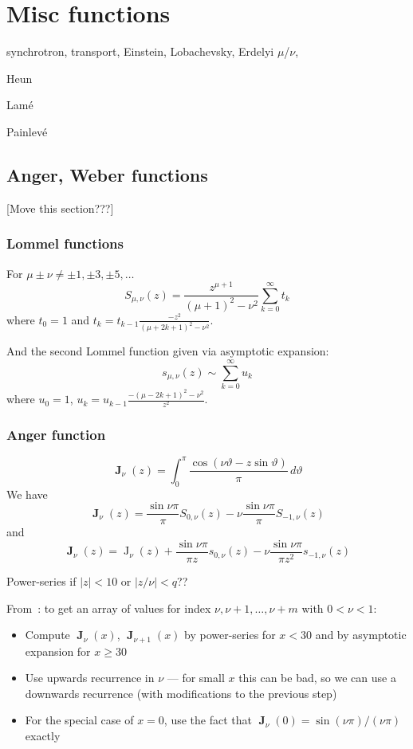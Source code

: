 \documentclass[10pt,dvipdfmx,letterpaper,twoside]{article}
\let\O=\operatorname
\newcommand{\Ob}[1]{\operatorname{\mathbf{#1}}}
\newenvironment{implementation}{\noindent\begin{framed}}{\end{framed}}
\let\theta=\vartheta
\begin{document}
\section{Misc functions}

synchrotron, transport, Einstein, Lobachevsky, Erdelyi $\mu$/$\nu$,

Heun

Lam\'e

Painlev\'e

\subsection{Anger, Weber functions}
[Move this section???]

\subsubsection{Lommel functions}
For $\mu\pm\nu\neq\pm1,\pm3,\pm5,\dots$
\[ S_{\mu,\nu}(z) = \frac{z^{\mu+1}}{(\mu+1)^2 - \nu^2} \sum_{k=0}^\infty t_k \]
where $t_0 = 1$ and $t_k = t_{k-1}\frac{-z^2}{(\mu+2k+1)^2 - \nu^2}$.

And the second Lommel function given via asymptotic expansion:
\[ s_{\mu,\nu}(z) \sim \sum_{k=0}^\infty u_k \]
where $u_0=1$, $u_k = u_{k-1}\frac{-(\mu-2k+1)^2 - \nu^2}{z^2}$.

\subsubsection{Anger function}
\[ \Ob{J}_\nu(z) = \int_0^\pi\frac{\cos(\nu\theta - z\sin\theta)}{\pi}\,d\theta \]
We have
\[ \Ob{J}_\nu(z) = \frac{\sin\nu\pi}{\pi}S_{0,\nu}(z) - \nu\frac{\sin\nu\pi}{\pi}S_{-1,\nu}(z) \]
and
\[ \Ob{J}_\nu(z) = \O{J}_\nu(z) + \frac{\sin\nu\pi}{\pi z}s_{0,\nu}(z) - \nu\frac{\sin\nu\pi}{\pi z^2}s_{-1,\nu}(z) \]

Power-series if $|z|<10$ or $|z/\nu|<q$??
\begin{implementation}
From~\cite{atlas:thompson}: to get an array of values for index $\nu, \nu+1, \dots, \nu+m$ with $0<\nu<1$:
\begin{itemize}
\item Compute $\Ob{J}_\nu(x)$, $\Ob{J}_{\nu+1}(x)$ by power-series for $x<30$ and by asymptotic expansion for $x\geq30$
\item Use upwards recurrence in $\nu$ --- for small $x$ this can be bad, so we can use a downwards recurrence
    (with modifications to the previous step)
\item For the special case of $x=0$, use the fact that $\Ob{J}_\nu(0) = \sin(\nu\pi)/(\nu\pi)$ exactly
\end{itemize}
\end{implementation}
\end{document}
